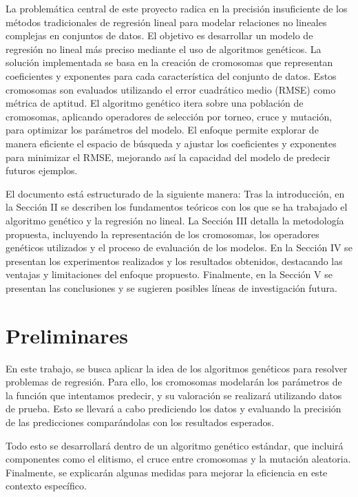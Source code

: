 \documentclass[conference,a4paper]{IEEEtran}
\begin{document}
La problemática central de este proyecto radica en la precisión insuficiente de los métodos tradicionales de regresión lineal para modelar relaciones no lineales complejas en conjuntos de datos. El objetivo es desarrollar un modelo de regresión no lineal más preciso mediante el uso de algoritmos genéticos. La solución implementada se basa en la creación de cromosomas que representan coeficientes y exponentes para cada característica del conjunto de datos. Estos cromosomas son evaluados utilizando el error cuadrático medio (RMSE) como métrica de aptitud. El algoritmo genético itera sobre una población de cromosomas, aplicando operadores de selección por torneo, cruce y mutación, para optimizar los parámetros del modelo. El enfoque permite explorar de manera eficiente el espacio de búsqueda y ajustar los coeficientes y exponentes para minimizar el RMSE, mejorando así la capacidad del modelo de predecir futuros ejemplos.

El documento está estructurado de la siguiente manera: Tras la introducción, en la Sección II se describen los fundamentos teóricos con los que se ha trabajado el algoritmo genético y la regresión no lineal. La Sección III detalla la metodología propuesta, incluyendo la representación de los cromosomas, los operadores genéticos utilizados y el proceso de evaluación de los modelos. En la Sección IV se presentan los experimentos realizados y los resultados obtenidos, destacando las ventajas y limitaciones del enfoque propuesto. Finalmente, en la Sección V se presentan las conclusiones y se sugieren posibles líneas de investigación futura.

\section{Preliminares}

En este trabajo, se busca aplicar la idea de los algoritmos genéticos para resolver problemas de regresión. Para ello, los cromosomas modelarán los parámetros de la función que intentamos predecir, y su valoración se realizará utilizando datos de prueba. Esto se llevará a cabo prediciendo los datos y evaluando la precisión de las predicciones comparándolas con los resultados esperados.

Todo esto se desarrollará dentro de un algoritmo genético estándar, que incluirá componentes como el elitismo, el cruce entre cromosomas y la mutación aleatoria. Finalmente, se explicarán algunas medidas para mejorar la eficiencia en este contexto específico.
\end{document}
